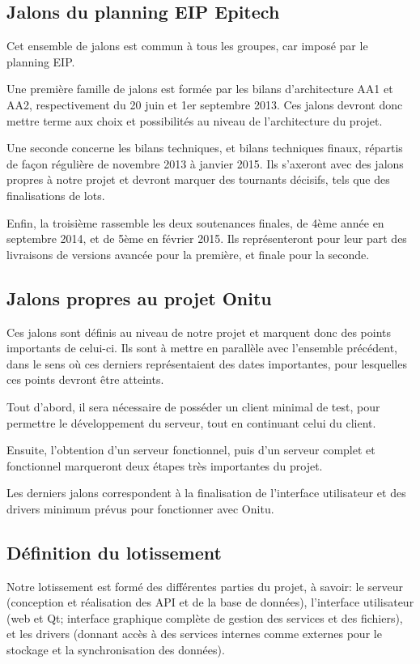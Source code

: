 \subsection{Jalons du planning EIP Epitech}
Cet ensemble de jalons est commun à tous les groupes, car imposé par le planning EIP.


Une première famille de jalons est formée par les bilans d'architecture AA1 et AA2, respectivement du 20 juin et 1er septembre 2013. Ces jalons devront donc mettre terme aux choix et possibilités au niveau de l'architecture du projet.

Une seconde concerne les bilans techniques, et bilans techniques finaux, répartis de façon régulière de novembre 2013 à janvier 2015. Ils s'axeront avec des jalons propres à notre projet et devront marquer des tournants décisifs, tels que des finalisations de lots.


Enfin, la troisième rassemble les deux soutenances finales, de 4ème année en septembre 2014, et de 5ème en février 2015. Ils représenteront pour leur part des livraisons de versions avancée pour la première, et finale pour la seconde.


\subsection{Jalons propres au projet Onitu}
Ces jalons sont définis au niveau de notre projet et marquent donc des points importants de celui-ci. Ils sont à mettre en parallèle avec l'ensemble précédent, dans le sens où ces derniers représentaient des dates importantes, pour lesquelles ces points devront être atteints.


Tout d'abord, il sera nécessaire de posséder un client minimal de test, pour permettre le développement du serveur, tout en continuant celui du client.


Ensuite, l'obtention d'un serveur fonctionnel, puis d'un serveur complet et fonctionnel marqueront deux étapes très importantes du projet.


Les derniers jalons correspondent à la finalisation de l'interface utilisateur et des drivers minimum prévus pour fonctionner avec Onitu.


\subsection{Définition du lotissement}
Notre lotissement est formé des différentes parties du projet, à savoir: le serveur (conception et réalisation des API et de la base de données), l'interface utilisateur (web et Qt; interface graphique complète de gestion des services et des fichiers), et les drivers (donnant accès à des services internes comme externes pour le stockage et la synchronisation des données).